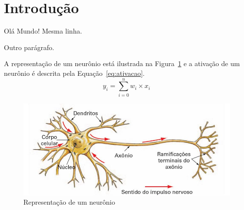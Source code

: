 \documentclass[a4paper, 12pt]{article}
\begin{document}
\section{Introdução}
Olá       Mundo!
Mesma linha.

Outro parágrafo.

A representação de um neurônio está ilustrada na Figura~\ref{fig:neuronio} e a ativação de um neurônio é descrita pela Equação~\ref{eq:ativacao}.
\begin{equation}
y_i = \sum_{i=0}^{n} w_i \times x_i
\end{equation}\label{eq:ativacao}

\begin{figure}[htb]
	\centering
	\includegraphics[scale=.5]{neuronio}
	\caption{Representação de um neurônio}\label{fig:neuronio}
\end{figure}
\end{document}
